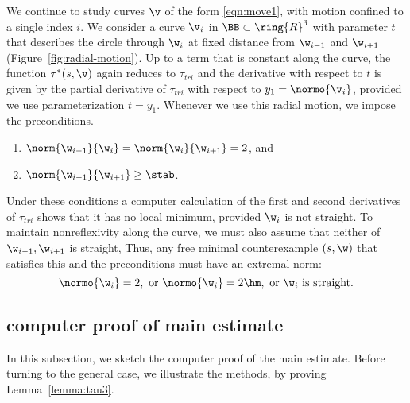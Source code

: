 %
\begin{remark}\label{rem:radial}
  We continue to study curves $\v$ of the form \eqref{eqn:move1}, with
  motion confined to a single index $i$.  We consider a curve $\v_i$
  in $\BB\subset\ring{R}^3$ with parameter $t$ that describes the
  circle through $\w_i$ at fixed distance from $\w_{i-1}$ and
  $\w_{i+1}$ (Figure~\ref{fig:radial-motion}).  Up to a term that is
  constant along the curve, the function $\tau^*(s,\v)$ again reduces
  to $\tau_{tri}$ and the derivative with respect to $t$ is given by
  the partial derivative of $\tau_{tri}$ with respect to
  $y_1=\normo{\v_i}$, provided we use parameterization $t=y_1$.
  Whenever we use this radial motion, we impose the preconditions.
\begin{enumerate}
\item $\norm{\w_{i-1}}{\w_i}=\norm{\w_i}{\w_{i+1}}=2$, and
\item $\norm{\w_{i-1}}{\w_{i+1}} \ge \stab$.
\end{enumerate}
Under these conditions a computer calculation of the first and second
derivatives of $\tau_{tri}$ shows that it has no local minimum, provided
$\w_i$ is not straight.
To maintain nonreflexivity along the curve, we must also assume that
 neither of $\w_{i-1},\w_{i+1}$ is straight,
Thus,  any free minimal counterexample $(s,\w)$ that satisfies this and
the preconditions
must have an extremal norm:
\begin{equation}\label{eqn:extremal}
\normo{\w_i}=2,\text{ or } \normo{\w_i}=2\hm, \text{ or } \w_i
\text{ is straight.}
\end{equation}
\end{remark}

\figMVFCDJQ %


\subsection{computer proof of main estimate}

In this subsection, we sketch the computer proof of the main estimate.
Before turning to the general case, we illustrate the methods, by
proving Lemma~\ref{lemma:tau3}.

